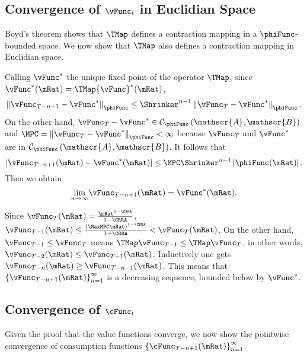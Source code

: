 \documentclass[\econtexRoot/BufferStockTheory]{subfiles}
\begin{document}
\subsection{Convergence of $\vFunc_{t}$ in Euclidian Space}\label{sec:vEuclidian}

Boyd's theorem shows that $\TMap$ defines a contraction mapping
in a $\phiFunc$-bounded space. We now show that $\TMap$ also
defines a contraction mapping in Euclidian space.

Calling $\vFunc^{\ast}$ the unique fixed point of the operator $\TMap$, since $\vFunc^{\ast }(\mRat)=\TMap {\vFunc}^{\ast }(\mRat)$,
\begin{equation}
\left\Vert \vFunc_{T-n+1}-\vFunc^{\ast }\right\Vert _{\phiFunc }\leq \Shrinker
^{n-1}\left\Vert \vFunc_{T}-\vFunc^{\ast }\right\Vert _{\phiFunc }.
\end{equation}%
On the other hand, $\vFunc_{T}-\vFunc^{\ast }\in \mathcal{C}_{\phiFunc }\left( \mathscr{A},
\mathscr{B}\right) $ and $\MPC =\left\Vert \vFunc_{T}-\vFunc^{\ast }\right\Vert_{\phiFunc }<\infty $ because $\vFunc_{T}$ and $\vFunc^{\ast }$ are in $\mathcal{C}_{\phiFunc
}\left( \mathscr{A},\mathscr{B}\right) $. It follows that%
\begin{equation}
\left\vert \vFunc_{T-n+1}(\mRat)-\vFunc^{\ast }(\mRat)\right\vert \leq \MPC \Shrinker^{n-1}\left\vert \phiFunc(\mRat)\right\vert.
\end{equation}%
Then we obtain
\begin{equation}
\underset{n\rightarrow \infty }{\lim }\vFunc_{T-n+1}(\mRat)=\vFunc^{\ast }(\mRat).
\end{equation}

Since $\vFunc_{T}(\mRat)=\frac{\mRat^{1-\CRRA }}{1-\CRRA }$, $\vFunc_{T-1}(\mRat)\leq \frac{\left(\MaxMPC \mRat\right)^{1-\CRRA}}{1-\CRRA}<\vFunc_{T}(\mRat)$. On the other hand, $\vFunc_{T-1}\leq \vFunc_{T}$
means $\TMap\vFunc_{T-1}\leq \TMap\vFunc_{T}$, in other words, $\vFunc_{T-2}(\mRat)\leq \vFunc_{T-1}(\mRat)$.
Inductively one gets $\vFunc_{T-n}(\mRat)\geq \vFunc_{T-n-1}(\mRat)$. This means that $\left\{
\vFunc_{T-n+1}(\mRat)\right\} _{n=1}^{\infty }$ is a decreasing sequence,
bounded below by $\vFunc^{\ast}$.


\subsection{Convergence of $\cFunc_{t}$}
\label{subsec:cConverges}%

Given the proof that the value functions converge, we now show the
pointwise convergence of consumption functions
$\left\{\cFunc_{T-n+1}(\mRat)\right\} _{n=1}^{\infty }$.
\end{document}
